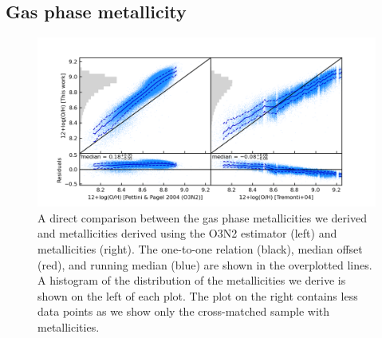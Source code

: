 \documentclass[fleqn,usenatbib]{mnras}
\begin{document}
\subsection{Gas phase metallicity}
\begin{figure}
    \centering
    \includegraphics[width=\textwidth]{figures/fig4.png}
    \caption{A direct comparison between the gas phase metallicities we derived and metallicities derived using the \protect \cite{pettini2004} O3N2 estimator (left) and \protect \cite{tremonti2004} metallicities (right). The one-to-one relation (black), median offset (red), and running median (blue) are shown in the overplotted lines. A histogram of the distribution of the metallicities we derive is shown on the left of each plot. The plot on the right contains less data points as we show only the cross-matched sample with \protect \cite{tremonti2004} metallicities.}
    \label{fig:model_metallicity_vs_PP04_O3N2}
\end{figure}
\end{document}
